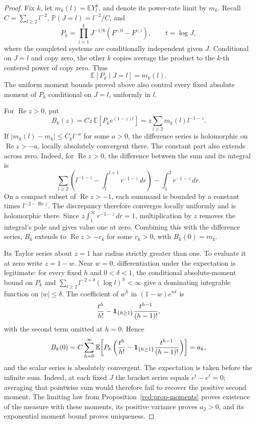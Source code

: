 \begin{proof}
Fix \(k\), let \(m_k(l)=\mathbb EY_l^k\), and denote its power-rate
limit by \(m_k\). Recall
\(C=\sum_{l\ge2}l^{-2}\),
\(\mathbb P(J=l)=l^{-2}/C\), and
\[
 P_k=\prod_{i=1}^k J^{-1/6}(F^{c,0}-F^{c,i}),
 \qquad t=\log J,
\]
where the completed systems are conditionally independent given
\(J\). Conditional on \(J=l\) and copy zero, the other \(k\)
copies average the product to the \(k\)-th centered power of copy
zero. Thus
\[
 \mathbb E[P_k\mid J=l]=m_k(l).
\]
The uniform moment bounds proved above also control every fixed
absolute moment of \(P_k\) conditional on \(J=l\), uniformly in \(l\).

For \(\operatorname{Re}z>0\), put
\[
 B_k(z)=Cz\,\mathbb E[P_k e^{(1-z)t}]
       =z\sum_{l\ge2}m_k(l)l^{-1-z}.
\]
If \(|m_k(l)-m_k|\le C_k l^{-a}\) for some \(a>0\), the difference
series is holomorphic on \(\operatorname{Re}z>-a\), locally
absolutely convergent there. The constant part also extends across
zero. Indeed, for \(\operatorname{Re}z>0\), the difference between
the sum and its integral is
\[
 \sum_{l\ge2}\left(l^{-1-z}-\int_l^{l+1}r^{-1-z}\,dr\right)
       -\int_1^2 r^{-1-z}\,dr.
\]
On a compact subset of \(\operatorname{Re}z>-1\), each summand is
bounded by a constant times \(l^{-2-\operatorname{Re}z}\).
The discrepancy therefore converges locally uniformly and is
holomorphic there. Since
\(z\int_1^\infty r^{-1-z}\,dr=1\), multiplication by \(z\)
removes the integral's pole and gives value one at zero. Combining
this with the difference series, \(B_k\) extends to
\(\operatorname{Re}z>-c_k\) for some \(c_k>0\), with
\(B_k(0)=m_k\).

Its Taylor series about \(z=1\) has radius strictly greater than one.
To evaluate it at zero write \(z=1-w\). Near \(w=0\), differentiation
under the expectation is legitimate: for every fixed \(h\) and
\(0<\delta<1\), the conditional absolute-moment bound on \(P_k\)
and \(\sum_{l\ge2}l^{-2+\delta}(\log l)^h<\infty\) give a
dominating integrable function on \(|w|\le\delta\).
The coefficient of \(w^h\)
in \((1-w)e^{wt}\) is
\[
 \frac{t^h}{h!}
 -{\bf1}_{\{h\ge1\}}\frac{t^{h-1}}{(h-1)!},
\]
with the second term omitted at \(h=0\). Hence
\[
 B_k(0)=C\sum_{h=0}^\infty
 \mathbb E\!\left[P_k\left(
  \frac{t^h}{h!}
  -{\bf1}_{\{h\ge1\}}\frac{t^{h-1}}{(h-1)!}
 \right)\right]=a_k,
\]
and the scalar series is absolutely convergent. The expectation is
taken before the infinite sum. Indeed, at each fixed \(J\) the
bracket series equals \(e^t-e^t=0\); averaging that pointwise sum
would therefore fail to recover the positive second moment.
The limiting law from Proposition~\ref{red:prop-moments} proves
existence of the measure with these moments, its positive variance
proves \(a_2>0\), and its exponential moment bound proves uniqueness.


\end{proof}
